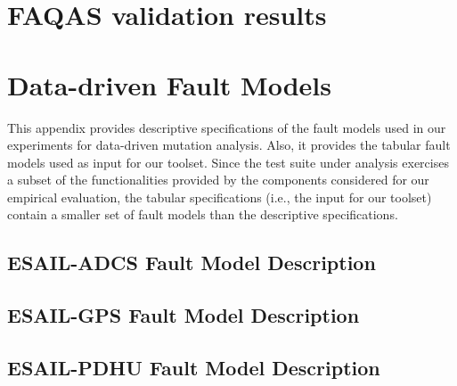 \documentclass[11pt,twoside]{book}
\begin{document}






\chapter{FAQAS validation results}
\label{ch:results}










\newpage

\appendix


\chapter{Data-driven Fault Models}
\label{appendix:FMS}

This appendix provides descriptive specifications of the fault models used in our experiments for data-driven mutation analysis. Also, it provides the tabular fault models used as input for our toolset. Since the test suite under analysis exercises a subset of the functionalities provided by the components considered for our empirical evaluation, the tabular specifications (i.e., the input for our toolset) contain a smaller set of fault models than the descriptive specifications.

\clearpage

\section{ESAIL-ADCS Fault Model Description}



\section{ESAIL-GPS Fault Model Description}



\section{ESAIL-PDHU Fault Model Description}
\end{document}
